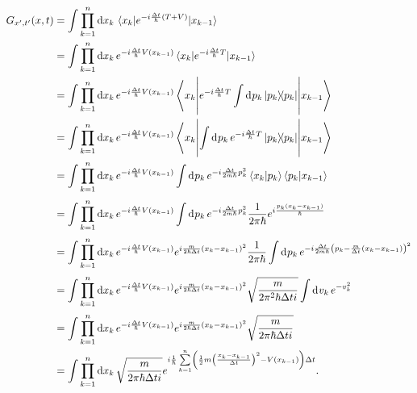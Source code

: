 \begin{align*}
	G_{x^{\prime}, t^{\prime}}(x, t) &= \int\prod\limits_{k = 1}^{n}\dd{x_{k}}\mel{x_{k}}{e^{-i\frac{\Delta t}{\hbar}(T + V)}}{x_{k - 1}} \\
	                                 &= \int\prod\limits_{k = 1}^{n}\dd{x_{k}}e^{-i\frac{\Delta t}{\hbar}V(x_{k - 1})}\mel{x_{k}}{e^{-i\frac{\Delta t}{\hbar}T}}{x_{k - 1}} \\
	                                 &= \int\prod\limits_{k = 1}^{n}\dd{x_{k}}e^{-i\frac{\Delta t}{\hbar}V(x_{k - 1})}\mel**{x_{k}}{e^{-i\frac{\Delta t}{\hbar}T}\int\limits_{}^{}\dd[]{p_{k}}\op{p_{k}}{p_{k}}}{x_{k - 1}} \\
	                                 &= \int\prod\limits_{k = 1}^{n}\dd{x_{k}}e^{-i\frac{\Delta t}{\hbar}V(x_{k - 1})}\mel**{x_{k}}{\int\limits_{}^{}\dd[]{p_{k}}e^{-i\frac{\Delta t}{\hbar}T}\op{p_{k}}{p_{k}}}{x_{k - 1}} \\
	                                 &= \int\prod\limits_{k = 1}^{n}\dd{x_{k}}e^{-i\frac{\Delta t}{\hbar}V(x_{k - 1})}\int\limits_{}^{}\dd[]{p_{k}}e^{-i\frac{\Delta t}{2m\hbar}p_{k}^{2}}\braket{x_{k}}{p_{k}}\braket{p_{k}}{x_{k - 1}} \\
	                                 &= \int\prod\limits_{k = 1}^{n}\dd{x_{k}}e^{-i\frac{\Delta t}{\hbar}V(x_{k - 1})}\int\limits_{}^{}\dd[]{p_{k}}e^{-i\frac{\Delta t}{2m\hbar}p_{k}^{2}}\frac{1}{2\pi\hbar}e^{i\frac{p_{k}(x_{k} - x_{k - 1})}{\hbar}} \\
	                                 &= \int\prod\limits_{k = 1}^{n}\dd{x_{k}}e^{-i\frac{\Delta t}{\hbar}V(x_{k - 1})}e^{i\frac{m}{2\hbar\Delta t}(x_{k} - x_{k - 1})^{2}}\frac{1}{2\pi\hbar}\int\limits_{}^{}\dd[]{p_{k}}e^{-i\frac{\Delta t}{2m\hbar}\left(p_{k} - \frac{m}{\Delta t}(x_{k} - x_{k - 1})\right)^{2}} \\
	                                 &= \int\prod\limits_{k = 1}^{n}\dd{x_{k}}e^{-i\frac{\Delta t}{\hbar}V(x_{k - 1})}e^{i\frac{m}{2\hbar\Delta t}(x_{k} - x_{k - 1})^{2}}\sqrt{\frac{m}{2\pi^{2}\hbar\Delta ti}}\int\limits_{}^{}\dd[]{v_{k}}e^{-v_{k}^{2}} \\
	                                 &= \int\prod\limits_{k = 1}^{n}\dd{x_{k}}e^{-i\frac{\Delta t}{\hbar}V(x_{k - 1})}e^{i\frac{m}{2\hbar\Delta t}(x_{k} - x_{k - 1})^{2}}\sqrt{\frac{m}{2\pi\hbar\Delta ti}} \\
	                                 &= \int\prod\limits_{k = 1}^{n}\dd{x_{k}}\sqrt{\frac{m}{2\pi\hbar\Delta ti}}e^{i\frac{1}{\hbar}\sum\limits_{k = 1}^{n}\left(\frac{1}{2}m\left(\frac{x_{k} - x_{k - 1}}{\Delta t}\right)^{2} - V(x_{k - 1})\right)\Delta t}.
\end{align*}
